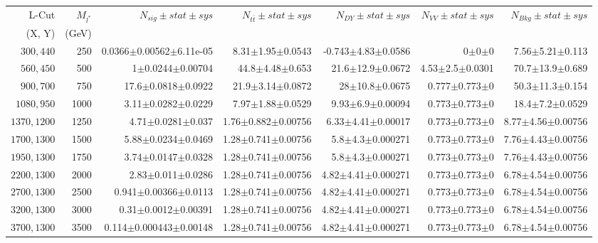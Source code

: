 \documentclass[]{article}
\begin{document}
\begin{table}
\begin{center}
\scriptsize{
\begin{tabular}{ |r|r|r|r|r|r|r|}
\hline 
L-Cut & $M_{l^*}$ & $N_{sig}\pm stat \pm sys $ &$N_{t\bar{t}}\pm stat \pm sys $ & $N_{DY}\pm stat \pm sys $ & $N_{VV}\pm stat \pm sys $ &$N_{Bkg}\pm stat \pm sys$\\
(X, Y) & (GeV) & && &&\\
\hline 
$300, 440$ & 250 & 0.0366$\pm$0.00562$\pm$6.11e-05 & 8.31$\pm$1.95$\pm$0.0543 & -0.743$\pm$4.83$\pm$0.0586 & 0$\pm$0$\pm$0 & 7.56$\pm$5.21$\pm$0.113 \\
$560, 450$ & 500 & 1$\pm$0.0244$\pm$0.00704 & 44.8$\pm$4.48$\pm$0.653 & 21.6$\pm$12.9$\pm$0.0672 & 4.53$\pm$2.5$\pm$0.0301 & 70.7$\pm$13.9$\pm$0.689 \\
$900, 700$ & 750 & 17.6$\pm$0.0818$\pm$0.0922 & 21.9$\pm$3.14$\pm$0.0872 & 28$\pm$10.8$\pm$0.0675 & 0.777$\pm$0.773$\pm$0 & 50.3$\pm$11.3$\pm$0.154 \\
$1080,950$ & 1000 & 3.11$\pm$0.0282$\pm$0.0229 & 7.97$\pm$1.88$\pm$0.0529 & 9.93$\pm$6.9$\pm$0.00094 & 0.773$\pm$0.773$\pm$0 & 18.4$\pm$7.2$\pm$0.0529 \\
$1370,1200$ & 1250 & 4.71$\pm$0.0281$\pm$0.037 & 1.76$\pm$0.882$\pm$0.00756 & 6.33$\pm$4.41$\pm$0.00017 & 0.773$\pm$0.773$\pm$0 & 8.77$\pm$4.56$\pm$0.00756 \\
$1700,1300$ & 1500 & 5.88$\pm$0.0234$\pm$0.0469 & 1.28$\pm$0.741$\pm$0.00756 & 5.8$\pm$4.3$\pm$0.000271 & 0.773$\pm$0.773$\pm$0 & 7.76$\pm$4.43$\pm$0.00756 \\
$1950,1300$ & 1750 & 3.74$\pm$0.0147$\pm$0.0328 & 1.28$\pm$0.741$\pm$0.00756 & 5.8$\pm$4.3$\pm$0.000271 & 0.773$\pm$0.773$\pm$0 & 7.76$\pm$4.43$\pm$0.00756 \\
$2200,1300$ & 2000 & 2.83$\pm$0.011$\pm$0.0286 & 1.28$\pm$0.741$\pm$0.00756 & 4.82$\pm$4.41$\pm$0.000271 & 0.773$\pm$0.773$\pm$0 & 6.78$\pm$4.54$\pm$0.00756 \\
$2700,1300$ & 2500 & 0.941$\pm$0.00366$\pm$0.0113 & 1.28$\pm$0.741$\pm$0.00756 & 4.82$\pm$4.41$\pm$0.000271 & 0.773$\pm$0.773$\pm$0 & 6.78$\pm$4.54$\pm$0.00756 \\
$3200,1300$ & 3000 & 0.31$\pm$0.0012$\pm$0.00391 & 1.28$\pm$0.741$\pm$0.00756 & 4.82$\pm$4.41$\pm$0.000271 & 0.773$\pm$0.773$\pm$0 & 6.78$\pm$4.54$\pm$0.00756 \\
$3700,1300$ & 3500 & 0.114$\pm$0.000443$\pm$0.00148 & 1.28$\pm$0.741$\pm$0.00756 & 4.82$\pm$4.41$\pm$0.000271 & 0.773$\pm$0.773$\pm$0 & 6.78$\pm$4.54$\pm$0.00756 \\

\end{tabular}}
\end{center}
\end{table}
\end{document}
